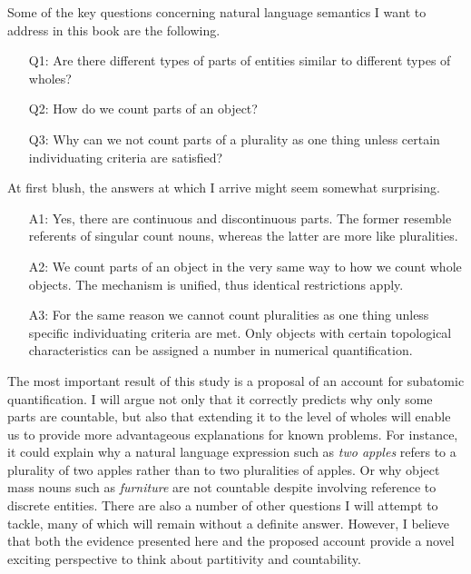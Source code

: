Some of the key questions concerning natural language semantics I want to address in this book are the following.

\begin{enumerate}
\item[Q1:] Are there different types of parts of entities similar to different types of wholes?
\item[Q2:] How do we count parts of an object?
\item[Q3:] Why can we not count parts of a plurality as one thing unless certain individuating criteria are satisfied?
\end{enumerate}

\noindent At first blush, the answers at which I arrive might seem somewhat surprising. 

\begin{enumerate}
\item[A1:] Yes, there are continuous and discontinuous parts. The former resemble referents of singular count nouns, whereas the latter are more like pluralities.
\item[A2:] We count parts of an object in the very same way to how we count whole objects. The mechanism is unified, thus identical restrictions apply. 
\item[A3:] For the same reason we cannot count pluralities as one thing unless specific individuating criteria are met. Only objects with certain topological characteristics can be assigned a number in numerical quantification.
\end{enumerate}

The most important result of this study is a proposal of an account for subatomic quantification. I will argue not only that it correctly predicts why only some parts are countable, but also that extending it to the level of wholes will enable us to provide more advantageous explanations for known problems. For instance, it could explain why a natural language expression such as \textit{two apples} refers to a plurality of two apples rather than to two pluralities of apples. Or why object mass nouns such as \textit{furniture} are not countable despite involving reference to discrete entities. There are also a number of other questions I will attempt to tackle, many of which will remain without a definite answer. However, I believe that both the evidence presented here and the proposed account provide a novel exciting perspective to think about partitivity and countability. 

